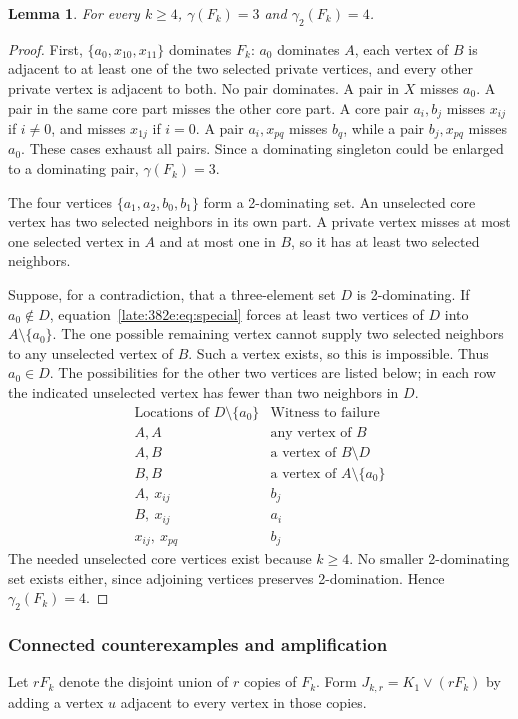 \documentclass[11pt,a4paper]{article}
\newtheorem{lemma}[theorem]{Lemma}
\theoremstyle{definition}\newtheorem{definition}[theorem]{Definition}
\theoremstyle{remark}\newtheorem{remark}[theorem]{Remark}
\begin{document}
\begin{lemma}\label{late:382e:lem:domination}
For every $k\geq4$, $\gamma(F_k)=3$ and $\gamma_2(F_k)=4$.
\end{lemma}
\begin{proof}
First, $\{a_0,x_{10},x_{11}\}$ dominates $F_k$: $a_0$ dominates $A$,
each vertex of $B$ is adjacent to at least one of the two selected private
vertices, and every other private vertex is adjacent to both.
No pair dominates. A pair in $X$ misses $a_0$. A pair in the same core
part misses the other core part. A core pair $a_i,b_j$ misses $x_{ij}$
if $i\ne0$, and misses $x_{1j}$ if $i=0$. A pair $a_i,x_{pq}$ misses
$b_q$, while a pair $b_j,x_{pq}$ misses $a_0$. These cases exhaust all
pairs. Since a dominating singleton could be enlarged to a dominating
pair, $\gamma(F_k)=3$.

The four vertices $\{a_1,a_2,b_0,b_1\}$ form a 2-dominating set.
An unselected core vertex has two selected neighbors in its own part.
A private vertex misses at most one selected vertex in $A$ and at most
one in $B$, so it has at least two selected neighbors.

Suppose, for a contradiction, that a three-element set $D$ is
2-dominating. If $a_0\notin D$, equation~\eqref{late:382e:eq:special} forces
at least two vertices of $D$ into $A\setminus\{a_0\}$. The one possible
remaining vertex cannot supply two selected neighbors to any unselected
vertex of $B$. Such a vertex exists, so this is impossible.
Thus $a_0\in D$. The possibilities for the other two vertices are listed
below; in each row the indicated unselected vertex has fewer than two
neighbors in $D$.
\[
\begin{array}{c|l}
\text{Locations of }D\setminus\{a_0\}&\text{Witness to failure}\\\hline
 A,A & \text{any vertex of }B\\
 A,B & \text{a vertex of }B\setminus D\\
 B,B & \text{a vertex of }A\setminus\{a_0\}\\
 A,\ x_{ij} & b_j\\
 B,\ x_{ij} & a_i\\
 x_{ij},\ x_{pq} & b_j
\end{array}
\]
The needed unselected core vertices exist because $k\geq4$.
No smaller 2-dominating set exists either, since adjoining vertices
preserves 2-domination. Hence $\gamma_2(F_k)=4$.
\end{proof}

\subsubsection{Connected counterexamples and amplification}
Let $rF_k$ denote the disjoint union of $r$ copies of $F_k$.
Form $J_{k,r}=K_1\vee(rF_k)$ by adding a vertex $u$ adjacent to every
vertex in those copies.
\end{document}
